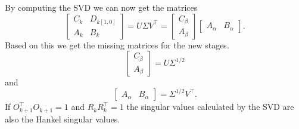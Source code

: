 \documentclass[doctype=mastersthesis,BCOR=15mm,biblatex]{ldvbook}%
\begin{document}
By computing the SVD we can now get the matrices
\begin{equation}
	\begin{bmatrix}
	C_k & D_{k[1,0]}\\
	A_k & B_k
	\end{bmatrix} = U \Sigma V^\top = \begin{bmatrix} C_\beta \\  A_\beta \end{bmatrix}
	\begin{bmatrix} A_\alpha &  B_\alpha  \end{bmatrix}
	.
\end{equation}
Based on this we get the missing matrices for the new stages.
\begin{equation}
	\begin{bmatrix} C_\beta \\  A_\beta \end{bmatrix} = U \Sigma^{1/2}
\end{equation}
and
\begin{equation}
\begin{bmatrix} A_\alpha &  B_\alpha  \end{bmatrix} = \Sigma^{1/2} V^\top
.
\end{equation}
If $O_{k+1}^\top O_{k+1} = 1$ and $R_k  R_k^\top = 1$ the singular values calculated by the SVD are also the Hankel singular values.
\end{document}
